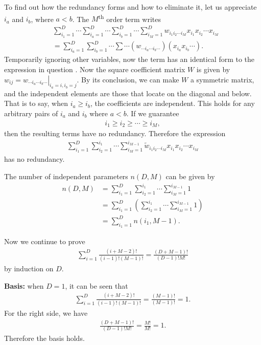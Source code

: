 \begin{answer}{}
	To find out how the redundancy forms and how to eliminate it, let us appreciate $i_a$ and $i_b$, where $a < b$. The $M$\textsuperscript{th} order term writes
	\begin{align}
		&\sum_{i_1 = 1}^{D} \cdots \sum_{i_a = 1}^{D} \cdots \sum_{i_b = 1}^{D} \cdots \sum_{i_M = 1}^{D} w_{i_1i_2\cdots i_M} x_{i_1}x_{i_2}\cdots x_{i_M}\\
		&= \sum_{i_a = 1}^{D}\sum_{i_b = 1}^{D} \cdots  \sum \cdots \left(w_{\cdots i_a \cdots i_b \cdots} \right)\left(x_{i_a}x_{i_b}\cdots\right).
	\end{align}
	Temporarily ignoring other variables, now the term has an identical form to the expression in question . Now the square coefficient matrix $W$ is given by $w_{ij} = \left.w_{\cdots i_a \cdots i_b \cdots}\right\rvert_{i_a = i, i_b = j}$. By its conclusion, we can make $W$ a symmetric matrix, and the independent elements are those that locate on the diagonal and below. That is to say, when $i_a \geq i_b$, the coefficients are independent. This holds for any arbitrary pairs of $i_a$ and $i_b$ where $a < b$.  If we guarantee
	\begin{align}
		i_1 \geq i_2 \geq \cdots \geq i_M,
	\end{align}
	then the resulting terms have no redundancy. Therefore the expression
	\begin{align}
		\sum_{i_1 = 1}^{D}\sum_{i_2=1}^{i_1}\cdots \sum_{i_M=1}^{i_{M-1}} \tilde{w}_{i_1i_2\cdots i_M} x_{i_1}x_{i_2}\cdots x_{i_M}
	\end{align}
	has no redundancy. 
	
	The number of independent parameters $n(D, M)$ can be given by
	\begin{align}
		n(D, M) &= 	\sum_{i_1 = 1}^{D}\sum_{i_2=1}^{i_1}\cdots \sum_{i_M=1}^{i_{M-1}} 1\\
		&=  \sum_{i_1 = 1}^{D} \left(\sum_{i_2=1}^{i_1} \cdots \sum_{i_M=1}^{i_{M-1}} 1\right)\\
		&= \sum_{i_1 = 1}^{D} n(i_1, M - 1).\label{1.15eqn2}
	\end{align}
	
	Now we continue to prove
	\begin{align}\label{1.15eqn1}
		\sum_{i = 1}^{D} \frac{(i + M - 2)!}{(i - 1)!(M - 1)!} = \frac{(D + M - 1)!}{(D-1)!M!}
	\end{align}
	by induction on $D$.
	
	\noindent\textbf{Basis:} when $D = 1$, it can be seen that
	\begin{align}
		\sum_{i = 1}^{D} \frac{(i + M - 2)!}{(i - 1)!(M - 1)!} = \frac{(M-1)!}{(M-1)!} = 1.
	\end{align} 
	For the right side, we have
	\begin{align}
		\frac{(D + M - 1)!}{(D-1)!M!} = \frac{M!}{M!} = 1.
	\end{align}
	Therefore the basis holds.
	

\end{answer}
